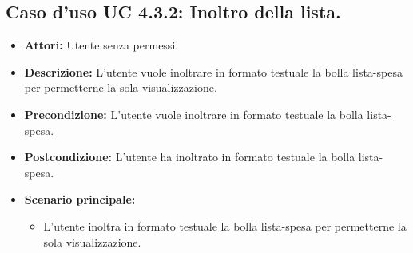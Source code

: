 \subsection{Caso d'uso UC 4.3.2: Inoltro della lista.}
\label{Caso d'uso UC 4.3.2: Inoltro della lista.}

\FloatBarrier
\begin{itemize}
\item \textbf{Attori:} Utente senza permessi.
\item \textbf{Descrizione:} L'utente vuole inoltrare in formato testuale la bolla lista-spesa per permetterne la sola visualizzazione.
\item \textbf{Precondizione:} L'utente vuole inoltrare in formato testuale la bolla lista-spesa. 
\item \textbf{Postcondizione:} L'utente ha inoltrato in formato testuale la bolla lista-spesa.
\item \textbf{Scenario principale:}
	\begin{itemize}
	\item L'utente inoltra in formato testuale la bolla lista-spesa per permetterne la sola visualizzazione.
	\end{itemize}
\end{itemize}